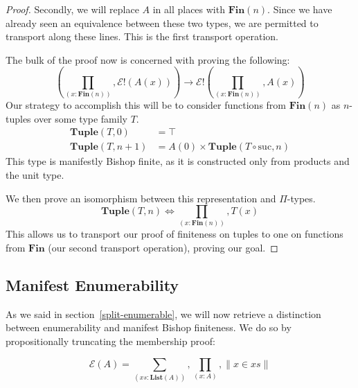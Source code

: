 \begin{refsection}
\begin{proof}
  Secondly, we will replace \(A\) in all places with \(\mathbf{Fin}(n)\).
  Since we have already seen an equivalence between these two types, we are
  permitted to transport along these lines.
  This is the first transport operation.

  The bulk of the proof now is concerned with proving the following:
  \begin{equation}
    \left( \prod_{(x : \mathbf{Fin}(n))} , \mathcal{E}!(A(x)) \right) \rightarrow \mathcal{E}!\left( \prod_{(x : \mathbf{Fin}(n))} , A(x) \right)
  \end{equation}
  Our strategy to accomplish this will be to consider functions from
  \(\mathbf{Fin}(n)\) as \(n\)-tuples over some type family \(T\).
  \begin{equation}
    \begin{aligned}
      \mathbf{Tuple}(T, 0)   &= \top \\
      \mathbf{Tuple}(T, n+1) &= A(0) \times \mathbf{Tuple}(T \circ \text{suc}, n)
    \end{aligned}
  \end{equation}
  This type is manifestly Bishop finite, as it is constructed only from products
  and the unit type.
  
  We then prove an isomorphism between this representation and \(\Pi\)-types.
  \begin{equation}
    \mathbf{Tuple}(T, n) \iff \prod_{(x : \mathbf{Fin}(n))} , T(x)
  \end{equation}
  This allows us to transport our proof of finiteness on tuples to one on
  functions from \(\mathbf{Fin}\) (our second transport operation), proving our
  goal.
  
\end{proof}
\subsection{Manifest Enumerability} \label{manifest-enumerability}
As we said in section~\ref{split-enumerable}, we will now retrieve a distinction
between enumerability and manifest Bishop finiteness.
We do so by propositionally truncating the membership proof:
\begin{definition}
  \begin{equation}
    \mathcal{E}(A) = \sum_{(\mathit{xs} : \mathbf{List}(A))} , \prod_{(x : A)} , \lVert x \in \mathit{xs} \rVert
  \end{equation}
\end{definition}


\end{refsection}
